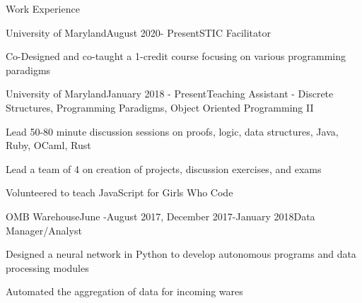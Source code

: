 \documentclass{resume} %
\begin{document}
\begin{rSection}{Work Experience}

\begin{rSubsection}{University of Maryland}{August 2020- Present}{STIC Facilitator}{}
\item Co-Designed and co-taught a 1-credit course focusing on various programming paradigms
\end{rSubsection}

\begin{rSubsection}{University of Maryland}{January 2018 - Present}{Teaching Assistant - Discrete Structures, Programming Paradigms, Object Oriented Programming II}{}
\item Lead 50-80 minute discussion sessions on proofs, logic, data structures, Java, Ruby, OCaml, Rust
\item Lead a team of 4 on creation of projects, discussion exercises, and exams 
\item Volunteered to teach JavaScript for Girls Who Code
\end{rSubsection}


\begin{rSubsection}{OMB Warehouse}{June -August 2017, December 2017-January 2018}{Data Manager/Analyst}{}
\item Designed a neural network in Python to develop autonomous programs and data processing modules
\item Automated the aggregation of data for incoming wares
\end{rSubsection}

\end{rSection}

\end{document}
